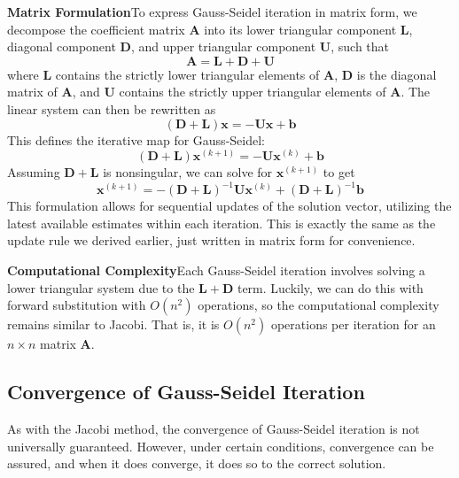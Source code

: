 \textbf{Matrix Formulation}\quad To express Gauss-Seidel iteration in matrix form, we decompose the coefficient matrix $\mathbf{A}$ into its lower triangular component $\mathbf{L}$, diagonal component $\mathbf{D}$, and upper triangular component $\mathbf{U}$, such that
\begin{equation*}
    \mathbf{A} = \mathbf{L} + \mathbf{D} + \mathbf{U}
\end{equation*}
where $\mathbf{L}$ contains the strictly lower triangular elements of $\mathbf{A}$, $\mathbf{D}$ is the diagonal matrix of $\mathbf{A}$, and $\mathbf{U}$ contains the strictly upper triangular elements of $\mathbf{A}$. The linear system can then be rewritten as
\begin{equation*}
    (\mathbf{D} + \mathbf{L})\mathbf{x} = -\mathbf{U}\mathbf{x} + \mathbf{b}
\end{equation*}
This defines the iterative map for Gauss-Seidel:
\begin{equation*}
    (\mathbf{D} + \mathbf{L})\mathbf{x}^{(k+1)} = -\mathbf{U}\mathbf{x}^{(k)} + \mathbf{b}
\end{equation*}
Assuming $\mathbf{D} + \mathbf{L}$ is nonsingular, we can solve for $\mathbf{x}^{(k+1)}$ to get
\begin{equation*}
    \mathbf{x}^{(k+1)} = -(\mathbf{D} + \mathbf{L})^{-1}\mathbf{U}\mathbf{x}^{(k)} + (\mathbf{D} + \mathbf{L})^{-1}\mathbf{b}
\end{equation*}
This formulation allows for sequential updates of the solution vector, utilizing the latest available estimates within each iteration. This is exactly the same as the update rule we derived earlier, just written in matrix form for convenience.

\textbf{Computational Complexity}\quad Each Gauss-Seidel iteration involves solving a lower triangular system due to the $\mathbf{L} + \mathbf{D}$ term. Luckily, we can do this with forward substitution with $O(n^2)$ operations, so the computational complexity remains similar to Jacobi. That is, it is $O(n^2)$ operations per iteration for an $n \times n$ matrix $\mathbf{A}$.

\subsection{Convergence of Gauss-Seidel Iteration}
As with the Jacobi method, the convergence of Gauss-Seidel iteration is not universally guaranteed. However, under certain conditions, convergence can be assured, and when it does converge, it does so to the correct solution.

